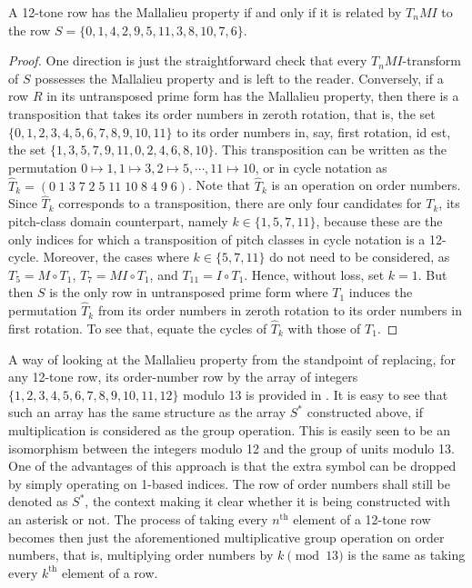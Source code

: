 \begin{proposition}
	\cite[17]{Morris1976}
	\label{morris-mallalieu}
	A 12-tone row has the Mallalieu property if and only if it is related by $T_nMI$ to the row $S = \{ 0, 1, 4, 2, 9, 5, 11, 3, 8, 10, 7, 6 \}$.
	\begin{proof}
		One direction is just the straightforward check that every $T_nMI$-transform of $S$ possesses the Mallalieu property and is left to the reader. Conversely, if a row $R$ in its untransposed prime form has the Mallalieu property, then there is a transposition that takes its order numbers in zeroth rotation, that is, the set $\{ 0, 1, 2, 3, 4, 5, 6, 7, 8, 9, 10, 11 \}$ to its order numbers in, say, first rotation, id est, the set $\{ 1, 3, 5, 7, 9, 11, 0, 2, 4, 6, 8, 10 \}$. This transposition can be written as the permutation $0 \mapsto 1, 1 \mapsto 3, 2 \mapsto 5, \cdots, 11 \mapsto 10 $, or in cycle notation as $\hat{T}_k = ( 0 \; 1 \; 3 \; 7 \; 2 \; 5 \; 11 \; 10 \; 8 \; 4 \; 9 \; 6 )$. Note that $\hat{T}_k$ is an operation on order numbers. Since $\hat{T}_k$ corresponds to a transposition, there are only four candidates for $T_k$, its pitch-class domain counterpart, namely $k \in \{ 1, 5, 7, 11 \}$, because these are the only indices for which a transposition of pitch classes in cycle notation is a 12-cycle. Moreover, the cases where $k \in \{5, 7, 11\}$ do not need to be considered, as $T_5 = M \circ T_1$, $T_7 = M I \circ T_1$, and $T_{11} = I \circ T_1$. Hence, without loss, set $k = 1$. But then $S$ is the only row in untransposed prime form where $T_1$ induces the permutation $\hat{T}_k$ from its order numbers in zeroth rotation to its order numbers in first rotation. To see that, equate the cycles of $\hat{T}_k$ with those of $T_1$.
	\end{proof}
\end{proposition}

A way of looking at the Mallalieu property from the standpoint of replacing, for any 12-tone row, its order-number row by the array of integers $\{ 1, 2, 3, 4, 5, 6, 7, 8, 9, 10, 11, 12 \}$ modulo 13 is provided in \cite[278]{Lewin1966}. It is easy to see that such an array has the same structure as the array $S^*$ constructed above, if multiplication is considered as the group operation. This is easily seen to be an isomorphism between the integers modulo 12 and the group of units modulo 13. One of the advantages of this approach is that the extra symbol can be dropped by simply operating on 1-based indices. The row of order numbers shall still be denoted as $S^*$, the context making it clear whether it is being constructed with an asterisk or not. The process of taking every $n^\text{th}$ element of a 12-tone row becomes then just the aforementioned multiplicative group operation on order numbers, that is, multiplying order numbers by $k \pmod{13}$ is the same as taking every $k^\text{th}$ element of a row.

